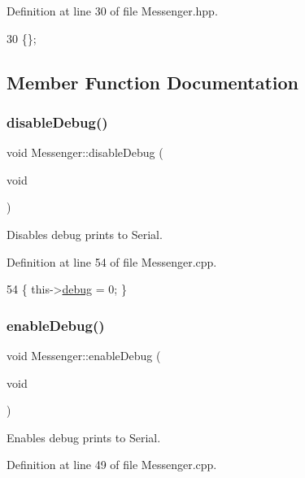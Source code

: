 Definition at line 30 of file Messenger.\+hpp.


\begin{DoxyCode}
30 \{\};
\end{DoxyCode}


\subsection{Member Function Documentation}
\mbox{\label{class_messenger_a31339b4d655cae6e8e7d567554210463}} 
\subsubsection{\texorpdfstring{disable\+Debug()}{disableDebug()}}
{\footnotesize\ttfamily void Messenger\+::disable\+Debug (\begin{DoxyParamCaption}\item[{void}]{ }\end{DoxyParamCaption})}



Disables debug prints to Serial. 



Definition at line 54 of file Messenger.\+cpp.


\begin{DoxyCode}
54 \{ this->\hyperlink{class_messenger_a103d1964b9540a6b6b1c4ea7d79f3af3}{debug} = 0; \}
\end{DoxyCode}
\mbox{\label{class_messenger_a6cb2c50700cc4b8824c7f6b07a3216ff}} 
\subsubsection{\texorpdfstring{enable\+Debug()}{enableDebug()}}
{\footnotesize\ttfamily void Messenger\+::enable\+Debug (\begin{DoxyParamCaption}\item[{void}]{ }\end{DoxyParamCaption})}



Enables debug prints to Serial. 



Definition at line 49 of file Messenger.\+cpp.


